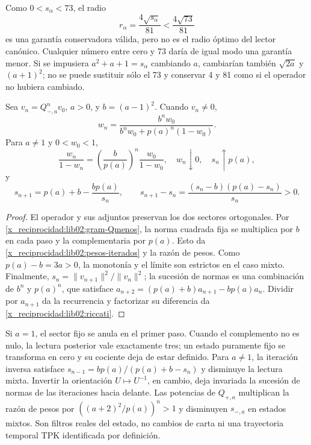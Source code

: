 Como \(0<s_\alpha<73\), el radio
\[
 r_\alpha=\frac{4\sqrt{s_\alpha}}{81}<\frac{4\sqrt{73}}{81}
\]
es una garantía conservadora válida, pero no es el radio óptimo del
lector canónico. Cualquier número entre cero y 73 daría de igual modo
una garantía menor. Si se impusiera \(a^2+a+1=s_\alpha\) cambiando
\(a\), cambiarían también \(\sqrt{2a}\) y \((a+1)^2\); no se
puede sustituir sólo el 73 y conservar 4 y 81 como si el operador no
hubiera cambiado.

\begin{theorem}
\label{x_reciprocidad:lib02:iteraciones}
Sea \(v_n=Q_{-,a}^nv_0\), \(a>0\), y
\(b=(a-1)^2\). Cuando \(v_n\ne0\),
\begin{equation}
 w_n=\frac{b^nw_0}{b^nw_0+p(a)^n(1-w_0)}.
 \label{x_reciprocidad:lib02:pesos-iterados}
\end{equation}
Para \(a\ne1\) y \(0<w_0<1\),
\[
 \frac{w_n}{1-w_n}
 =\left(\frac b{p(a)}\right)^n\frac{w_0}{1-w_0},
 \quad w_n\downarrow0,\quad s_n\uparrow p(a),
\]
y
\begin{equation}
 s_{n+1}=p(a)+b-\frac{bp(a)}{s_n},\qquad
 s_{n+1}-s_n=\frac{(s_n-b)(p(a)-s_n)}{s_n}>0.
 \label{x_reciprocidad:lib02:riccati}
\end{equation}
\end{theorem}
\begin{proof}
El operador y sus adjuntos preservan los dos sectores ortogonales. Por
\eqref{x_reciprocidad:lib02:gram-Qmenos}, la norma cuadrada fija se multiplica por
\(b\) en cada paso y la complementaria por \(p(a)\). Esto da
\eqref{x_reciprocidad:lib02:pesos-iterados} y la razón de pesos. Como
\(p(a)-b=3a>0\), la monotonía y el límite son estrictos en el caso
mixto. Finalmente,
\(s_n=\|v_{n+1}\|^2/\|v_n\|^2\); la sucesión de normas es
una combinación de \(b^n\) y \(p(a)^n\), que satisface
\(a_{n+2}=(p(a)+b)a_{n+1}-bp(a)a_n\). Dividir por
\(a_{n+1}\) da la recurrencia y factorizar su diferencia da
\eqref{x_reciprocidad:lib02:riccati}.
\end{proof}

Si \(a=1\), el sector fijo se anula en el primer paso. Cuando el
complemento no es nulo, la lectura posterior vale exactamente tres;
un estado puramente fijo se transforma en cero y su cociente deja de
estar definido. Para \(a\ne1\), la iteración inversa satisface
\(s_{n-1}=bp(a)/(p(a)+b-s_n)\) y disminuye la lectura mixta.
Invertir la orientación \(U\mapsto U^{-1}\), en cambio, deja
invariada la sucesión de normas de las iteraciones hacia delante.
Las potencias de \(Q_{+,a}\) multiplican la razón de pesos por
\(((a+2)^2/p(a))^n>1\) y disminuyen \(s_{-,a}\) en estados
mixtos. Son filtros reales del estado, no cambios de carta ni una
trayectoria temporal TPK identificada por definición.


